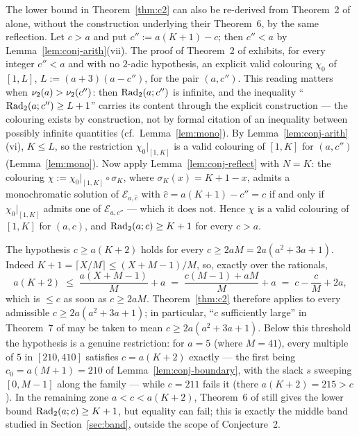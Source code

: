 \begin{remark}\label{rem:conj-lb}
The lower bound in Theorem~\ref{thm:c2} can also be re-derived from
Theorem~2 of \cite{DT2020} alone, without the construction underlying
their Theorem~6, by the same reflection. Let $c > a$ and put
$c'' := a(K+1) - c$; then $c'' < a$ by Lemma~\ref{lem:conj-arith}(vii).
The proof of Theorem~2 of \cite{DT2020} exhibits, for every integer
$c'' < a$ and with no $2$-adic hypothesis, an explicit valid colouring
$\chi_0$ of $[1, L]$, $L := (a+3)(a - c'')$, for the pair $(a, c'')$.
This reading matters when $\nu_2(a) > \nu_2(c'')$: then $\mathrm{Rad}_2(a;c'')$ is
infinite, and the inequality ``$\mathrm{Rad}_2(a;c'') \ge L + 1$'' carries its
content through the explicit construction --- the colouring exists by
construction, not by formal citation of an inequality between possibly
infinite quantities (cf.\ Lemma~\ref{lem:mono}). By
Lemma~\ref{lem:conj-arith}(vi), $K \le L$, so the restriction
$\chi_0|_{[1,K]}$ is a valid colouring of $[1,K]$ for $(a, c'')$
(Lemma~\ref{lem:mono}). Now apply Lemma~\ref{lem:conj-reflect} with
$N = K$: the colouring $\chi := \chi_0|_{[1,K]} \circ \sigma_K$, where
$\sigma_K(x) = K + 1 - x$, admits a monochromatic solution of
$\mathcal{E}_{a,\hat c}$ with $\hat c = a(K+1) - c'' = c$ if and only if
$\chi_0|_{[1,K]}$ admits one of $\mathcal{E}_{a,c''}$ --- which it does
not. Hence $\chi$ is a valid colouring of $[1,K]$ for $(a,c)$, and
$\mathrm{Rad}_2(a;c) \ge K + 1$ for every $c > a$.
\end{remark}

\begin{remark}\label{rem:conj-range}
The hypothesis $c \ge a(K+2)$ holds for every
$c \ge 2aM = 2a(a^2 + 3a + 1)$. Indeed
$K + 1 = \lceil X/M \rceil \le (X + M - 1)/M$, so, exactly over the
rationals,
\[
a(K+2) \;\le\; \frac{a(X + M - 1)}{M} + a
\;=\; \frac{c(M-1) + aM}{M} + a
\;=\; c - \frac{c}{M} + 2a ,
\]
which is $\le c$ as soon as $c \ge 2aM$. Theorem~\ref{thm:c2} therefore
applies to every admissible $c \ge 2a(a^2+3a+1)$; in particular,
``$c$ sufficiently large'' in Theorem~7 of \cite{DT2020} may be taken to
mean $c \ge 2a(a^2+3a+1)$. Below this threshold the hypothesis is a
genuine restriction: for $a = 5$ (where $M = 41$), every multiple of $5$
in $[210, 410]$ satisfies $c = a(K+2)$ exactly --- the first being
$c_0 = a(M+1) = 210$ of Lemma~\ref{lem:conj-boundary}, with the slack $s$
sweeping $[0, M-1]$ along the family --- while $c = 211$ fails it (there
$a(K+2) = 215 > c$). In the remaining zone $a < c < a(K+2)$, Theorem~6 of
\cite{DT2020} still gives the lower bound $\mathrm{Rad}_2(a;c) \ge K + 1$, but
equality can fail; this is exactly the middle band studied in
Section~\ref{sec:band}, outside the scope of Conjecture~2.
\end{remark}
